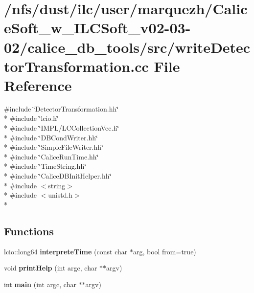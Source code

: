 \section{/nfs/dust/ilc/user/marquezh/\-Calice\-Soft\-\_\-w\-\_\-\-I\-L\-C\-Soft\-\_\-v02-\/03-\/02/calice\-\_\-db\-\_\-tools/src/write\-Detector\-Transformation.cc File Reference}
\label{writeDetectorTransformation_8cc}
{\ttfamily \#include \char`\"{}Detector\-Transformation.\-hh\char`\"{}}\\*
{\ttfamily \#include \char`\"{}lcio.\-h\char`\"{}}\\*
{\ttfamily \#include \char`\"{}I\-M\-P\-L/\-L\-C\-Collection\-Vec.\-h\char`\"{}}\\*
{\ttfamily \#include \char`\"{}D\-B\-Cond\-Writer.\-hh\char`\"{}}\\*
{\ttfamily \#include \char`\"{}Simple\-File\-Writer.\-hh\char`\"{}}\\*
{\ttfamily \#include \char`\"{}Calice\-Run\-Time.\-hh\char`\"{}}\\*
{\ttfamily \#include \char`\"{}Time\-String.\-hh\char`\"{}}\\*
{\ttfamily \#include \char`\"{}Calice\-D\-B\-Init\-Helper.\-hh\char`\"{}}\\*
{\ttfamily \#include $<$string$>$}\\*
{\ttfamily \#include $<$unistd.\-h$>$}\\*
\subsection*{Functions}
\begin{DoxyCompactItemize}
\item 
lcio\-::long64 {\bfseries interprete\-Time} (const char $\ast$arg, bool from=true)\label{writeDetectorTransformation_8cc_ad4bc1ee6b3bcb259bd28bb7963f34db0}

\item 
void {\bfseries print\-Help} (int argc, char $\ast$$\ast$argv)\label{writeDetectorTransformation_8cc_a1b5a1d3071ab7a7222af534a20a6aba6}

\item 
int {\bfseries main} (int argc, char $\ast$$\ast$argv)\label{writeDetectorTransformation_8cc_a3c04138a5bfe5d72780bb7e82a18e627}

\end{DoxyCompactItemize}


